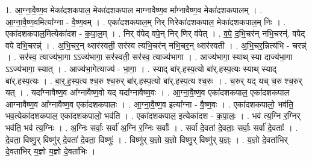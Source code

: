 \documentclass[17pt]{extarticle}
\begin{document}
1. आ॒ग्ना॒वै॒ष्ण॒व मेका॑दशकपाल॒ मेका॑दशकपाल माग्नावैष्ण॒व मा᳚ग्नावैष्ण॒व मेका॑दशकपालम् । . आ॒ग्ना॒वै॒ष्ण॒वमित्या᳚ग्ना - वै॒ष्ण॒वम् । . एका॑दशकपाल॒म् निर् णिरेका॑दशकपाल॒ मेका॑दशकपाल॒म् निः । . एका॑दशकपाल॒मित्येका॑दश - क॒पा॒ल॒म् । . निर् व॑पेद् वपे॒न् निर् णिर् व॑पेत् । . व॒पे॒ द॒भि॒चर॑न् नभि॒चरन्॑. वपेद् वपे दभि॒चरन्न्॑ । . अ॒भि॒चर॒न् थ्सर॑स्वती॒ सर॑स्व त्यभि॒चर॑न् नभि॒चर॒न् थ्सर॑स्वती । . अ॒भि॒चर॒न्नित्य॑भि - चरन्न्॑ । . सर॑स्व॒ त्याज्य॑भा॒गा ऽऽज्य॑भागा॒ सर॑स्वती॒ सर॑स्व॒ त्याज्य॑भागा । . आज्य॑भागा॒ स्याथ् स्या दाज्य॑भा॒गा ऽऽज्य॑भागा॒ स्यात् । . आज्य॑भा॒गेत्याज्य॑ - भा॒गा॒ । . स्याद् बा॑र्.हस्प॒त्यो बा॑र्.हस्प॒त्यः स्याथ् स्याद् बा॑र्.हस्प॒त्यः । . बा॒र्॒.ह॒स्प॒त्य श्च॒रु श्च॒रुर् बा॑र्.हस्प॒त्यो बा॑र्.हस्प॒त्य श्च॒रुः । . च॒रुर् यद् यच् च॒रु श्च॒रुर् यत् । . यदा᳚ग्नावैष्ण॒व आ᳚ग्नावैष्ण॒वो यद् यदा᳚ग्नावैष्ण॒वः । . आ॒ग्ना॒वै॒ष्ण॒व एका॑दशकपाल॒ एका॑दशकपाल आग्नावैष्ण॒व आ᳚ग्नावैष्ण॒व एका॑दशकपालः । . आ॒ग्ना॒वै॒ष्ण॒व इत्या᳚ग्ना - वै॒ष्ण॒वः । . एका॑दशकपालो॒ भव॑ति॒ भव॒त्येका॑दशकपाल॒ एका॑दशकपालो॒ भव॑ति । . एका॑दशकपाल॒ इत्येका॑दश - क॒पा॒लः॒ । . भव॑ त्य॒ग्नि र॒ग्निर् भव॑ति॒ भव॑ त्य॒ग्निः । . अ॒ग्निः सर्वाः॒ सर्वा॑ अ॒ग्नि र॒ग्निः सर्वाः᳚ । . सर्वा॑ दे॒वता॑ दे॒वताः॒ सर्वाः॒ सर्वा॑ दे॒वताः᳚ । . दे॒वता॒ विष्णु॒र् विष्णु॑र् दे॒वता॑ दे॒वता॒ विष्णुः॑ । . विष्णु॑र् य॒ज्ञो य॒ज्ञो विष्णु॒र् विष्णु॑र् य॒ज्ञ्ः । . य॒ज्ञो दे॒वता॑भिर् दे॒वता॑भिर् य॒ज्ञो य॒ज्ञो दे॒वता॑भिः । \newline
\end{document}
